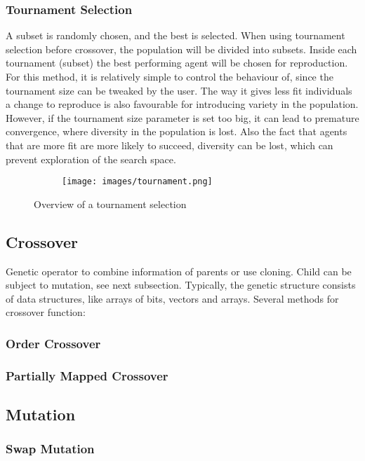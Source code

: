 \documentclass{article}
\begin{document}
\bigskip
\subsubsection{Tournament Selection}
A subset is randomly chosen, and the best is selected. When using tournament selection before crossover, the population will be divided into subsets. Inside each tournament (subset) the best performing agent will be chosen for reproduction. For this method, it is relatively simple to control the behaviour of, since the tournament size can be tweaked by the user. The way it gives less fit individuals a change to reproduce is also favourable for introducing variety in the population.\smallskip 
However, if the tournament size parameter is set too big, it can lead to premature convergence, where diversity in the population is lost. Also the fact that agents that are more fit are more likely to succeed, diversity can be lost, which can prevent exploration of the search space.

\begin{figure}
  \centering
  \begin{subfigure}[H]{0.5\linewidth}
    \texttt{[image: images/tournament.png]}
  \end{subfigure}
  \caption{Overview of a tournament selection}
  \label{fig:tournament}
\end{figure}


\newpage
\subsection{Crossover}
Genetic operator to combine information of parents or use cloning. Child can be subject to mutation, see next subsection. Typically, the genetic structure consists of data structures, like arrays of bits, vectors and arrays.\smallbreak
Several methods for crossover function:
\subsubsection{Order Crossover}
\subsubsection{Partially Mapped Crossover}

\bigskip
\subsection{Mutation}
\subsubsection{Swap Mutation}
\end{document}

